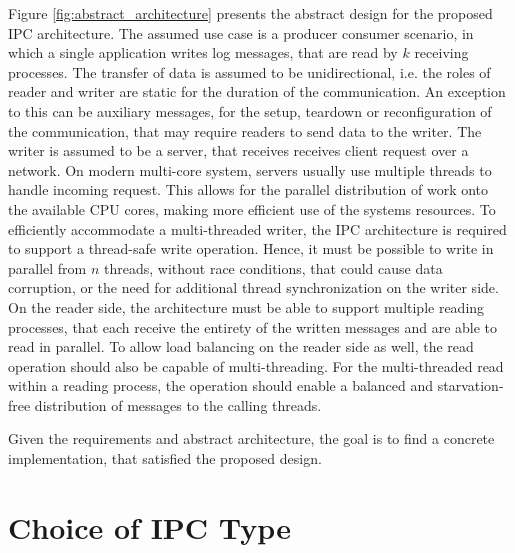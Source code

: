 Figure \ref{fig:abstract_architecture} presents the abstract design for the proposed \ac{IPC} architecture.
The assumed use case is a producer consumer scenario, in which a single application writes log messages, that 
are read by $k$ receiving processes. The transfer of data is assumed to be unidirectional, i.e. the roles of reader and writer are static for the duration of the
communication. An exception to this can be auxiliary messages, for the setup, teardown or reconfiguration of the communication, that may require readers to send
data to the writer. The writer is assumed to be a server, that receives receives client request over a network.
On modern multi-core system, servers usually use multiple threads to handle incoming request.
This allows for the parallel distribution of work onto the available CPU cores, making more efficient use of the systems resources. To efficiently accommodate a 
multi-threaded writer, the \ac{IPC} architecture is required to support a thread-safe write operation. Hence, it must be possible to
write in parallel from $n$ threads, without race conditions, that could cause data corruption, or the need for additional thread synchronization    
on the writer side. On the reader side, the architecture must be able to support multiple reading processes, that each receive the entirety
of the written messages and are able to read in parallel. To allow load balancing on the reader side as well, the read operation
should also be capable of multi-threading. For the multi-threaded read within a reading process, the operation should enable a balanced and starvation-free distribution 
of messages to the calling threads.  
\par
Given the requirements and abstract architecture, the goal is to find a concrete implementation, that satisfied the proposed design.


\section{Choice of IPC Type}

